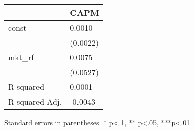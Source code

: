 \begin{table}
\caption{}
\label{}
\begin{center}
\begin{tabular}{ll}
\hline
               & CAPM      \\
\hline
const          & 0.0010    \\
               & (0.0022)  \\
mkt\_rf        & 0.0075    \\
               & (0.0527)  \\
R-squared      & 0.0001    \\
R-squared Adj. & -0.0043   \\
\hline
\end{tabular}
\end{center}
\end{table}
\bigskip
Standard errors in parentheses. \newline 
* p<.1, ** p<.05, ***p<.01